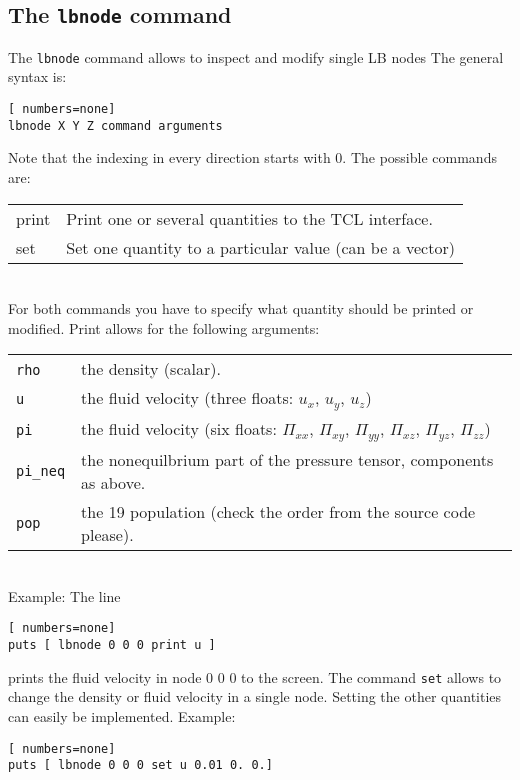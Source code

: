 \subsection*{The \lstinline|lbnode| command}
The \lstinline|lbnode| command allows to inspect and modify single LB nodes The
general syntax is:
\vspace{0,2cm}
\begin{lstlisting}[ numbers=none]
lbnode X Y Z command arguments
\end{lstlisting}
\vspace{0,2cm}
Note that the indexing in every direction starts with 0. The possible commands are:\\
\begin{tabular}{p{}p{}}
  print & Print one or several quantities to the TCL interface.\\
  set & Set one quantity to a particular value (can be a vector)\\
\end{tabular}\\
For both commands you have to specify what quantity should be printed
or modified. Print allows for the following arguments: \\
\begin{tabular}{p{}p{}}
  \lstinline|rho|\ & the density (scalar). \\
  \lstinline|u| & the fluid velocity (three floats: $u_x$, $u_y$, $u_z$) \\
  \lstinline|pi| & the fluid velocity (six floats: $\Pi_{xx}$, $\Pi_{xy}$, $\Pi_{yy}$, $\Pi_{xz}$,  $\Pi_{yz}$,  $\Pi_{zz}$) \\
  \lstinline|pi_neq| & the nonequilbrium part of the pressure tensor, components as above. \\
  \lstinline|pop| & the 19 population (check the order from the source code please).
\end{tabular} \\
Example:
The line
\begin{lstlisting}[ numbers=none]
puts [ lbnode 0 0 0 print u ]
\end{lstlisting}
prints the fluid velocity in node 0 0 0 to the screen.
The command \lstinline|set| allows to change the density or fluid velocity in a single node. Setting
the other quantities can easily be implemented.
Example:
\begin{lstlisting}[ numbers=none]
puts [ lbnode 0 0 0 set u 0.01 0. 0.]
\end{lstlisting}
